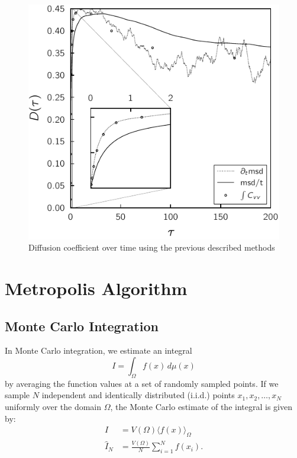 \documentclass[ansiapaper]{report}
\begin{document}
\begin{multicols}{3}
\begin{figure}[H]
    \begin{center}
        \includegraphics[width=1\linewidth]{figures/diffusion_calculation.pdf}
    \end{center}
    \caption{Diffusion coefficient over time using the previous described methods}\label{fig:diffusion-calculation}
\end{figure}

\chapter{Metropolis Algorithm}

\section{Monte Carlo Integration}
In Monte Carlo integration, we estimate an integral
\[
I = \int_{\Omega} f(x) \, d\mu(x)
\]
by averaging the function values at a set of randomly sampled points. If we sample \( N \) independent and identically distributed (i.i.d.) points \( x_1, x_2, \ldots, x_N \) uniformly over the domain \( \Omega \), the Monte Carlo estimate of the integral is given by:
\begin{align*}
    I &= V(\Omega) \langle f(x) \rangle_{\Omega} \\
    \hat{I}_N &= \frac{V(\Omega)}{N} \sum_{i=1}^N f(x_i). \\
\end{align*}


\end{multicols}
\end{document}
